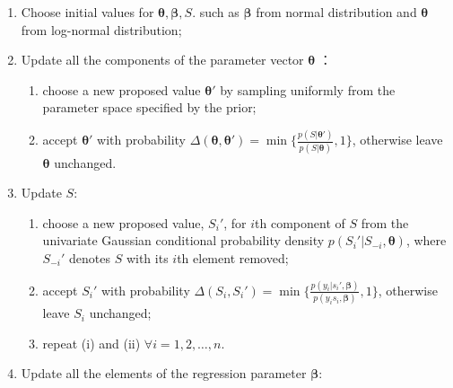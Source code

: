 \documentclass[12pt,a4paper,UTF8,twoside]{book}
\providecommand{\tightlist}{%
  \setlength{\itemsep}{0pt}\setlength{\parskip}{0pt}}
\begin{document}
\begin{enumerate}
\def\labelenumi{\arabic{enumi}.}
\tightlist
\item
  Choose initial values for
  \(\boldsymbol{\theta},\boldsymbol{\beta},S\). such as
  \(\boldsymbol{\beta}\) from normal distribution and
  \(\boldsymbol{\theta}\) from log-normal distribution;
\item
  Update all the components of the parameter vector
  \(\boldsymbol{\theta}\) ：

  \begin{enumerate}
  \def\labelenumii{(\roman{enumii})}
  \tightlist
  \item
    choose a new proposed value \(\boldsymbol{\theta}'\) by sampling
    uniformly from the parameter space specified by the prior;
  \item
    accept \(\boldsymbol{\theta}'\) with probability
    \(\Delta(\boldsymbol{\theta},\boldsymbol{\theta}') = \min \big\{\frac{p(S|\boldsymbol{\theta}')}{p(S|\boldsymbol{\theta})},1\big\}\),
    otherwise leave \(\boldsymbol{\theta}\) unchanged.
  \end{enumerate}
\item
  Update \(S\):

  \begin{enumerate}
  \def\labelenumii{(\roman{enumii})}
  \tightlist
  \item
    choose a new proposed value, \(S_{i}'\), for \(i\)th component of
    \(S\) from the univariate Gaussian conditional probability density
    \(p(S_{i}'|S_{-i},\boldsymbol{\theta})\), where \(S_{-i}'\) denotes
    \(S\) with its \(i\)th element removed;
  \item
    accept \(S_{i}'\) with probability
    \(\Delta(S_{i},S_{i}') = \min\big\{ \frac{p(y_{i}|s_{i}',\boldsymbol{\beta})}{p(y_{i}s_{i},\boldsymbol{\beta})},1 \big\}\),
    otherwise leave \(S_i\) unchanged;
  \item
    repeat (i) and (ii) \(\forall i = 1,2,\ldots,n\).
  \end{enumerate}
\item
  Update all the elements of the regression parameter
  \(\boldsymbol{\beta}\):


\end{enumerate}
\end{document}
